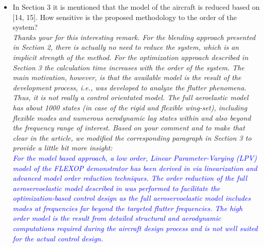 \documentclass{article}
\begin{document}
\begin{itemize}
\item In Section 3 it is mentioned that the model of the aircraft is reduced based on [14, 15]. How sensitive is the proposed methodology to the order of the system?  \\
\textit{Thanks your for this interesting remark.  For the blending approach presented in Section 2, there is actually no need to reduce the system, which is an implicit strength of the method. For the optimization approach described in Section 3 the calculation time increases with the order of the system. The main motivation, however, is that the available model is the result of the development process, i.e., was developed to analyze the flutter phenomena. Thus, it is not really a control orientated model.
The full aeroelastic model has about 1000 states (in case of the rigid and flexible wing-set), including flexible modes and numerous aerodynamic lag states within and also beyond the frequency range of interest. Based on your comment and to make that clear in the article, we modified the corresponding paragraph in Section 3 to provide a little bit more insight:}\\
\textit{\textcolor{blue}{
For the model based approach, a low order, Linear Parameter-Varying (LPV) model of the FLEXOP demonstrator  has been derived in \cite{luspay18a, Luspay18} via linearization and advanced model order reduction techniques.
The order reduction of the full aeroservoelastic model described in \cite{Wuestenhagen18} was performed to facilitate the optimization-based control design as the full aeroservoelastic model includes modes at frequencies far beyond the targeted flutter frequencies. The high order model is the result from detailed structural and aerodynamic computations required during the aircraft design process and is not well suited for the actual control design.
}}

\newpage


\end{itemize}
\end{document}

